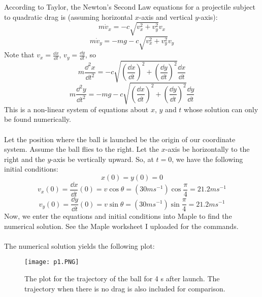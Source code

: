 \documentclass{article}
\begin{document}
\begin{enumerate}
  According to Taylor\cite{Taylor2005}, the Newton's Second Law equations for a projectile subject to quadratic drag is
  (assuming horizontal \(x\)-axis and vertical \(y\)-axis):
  \begin{equation}
     m \dot{v}_x = -c\sqrt{v_{x}^2 +v_y^2} v_x
  \end{equation}
  \begin{equation}
    m\dot{v}_y = -mg - c\sqrt{v_{x}^2 +v_y^2} v_y
  \end{equation}
  Note that \(v_x= \frac{\dd x}{\dd t}\), \(v_y = \frac{\dd y}{\dd t}\), so
  \begin{equation}
     m \frac{\dd^2x}{\dd t^2}  = -c \sqrt{\left(\frac{\dd x}{\dd t}\right)^2 + \left(\frac{\dd y}{\dd t}\right)^2 } \frac{\dd x}{\dd t}
  \end{equation}
  \begin{equation}
    m \frac{\dd^2y}{\dd t^2} = -mg -c \sqrt{\left(\frac{\dd x}{\dd t}\right)^2 + \left(\frac{\dd y}{\dd t}\right)^2 } \frac{\dd y}{\dd t}
  \end{equation}
  This is a non-linear system of equations about \(x\), \(y\) and \(t\) whose solution can only be found numerically.\\
  \\
  Let the position where the ball is launched be the origin of our coordinate system. Assume the ball flies to the right.
  Let the \(x\)-axis be horizontally to the right and the \(y\)-axis be vertically upward. So, at \(t=0\), we have the following
  initial conditions:
  \begin{equation}
    x(0)=y(0)=0
  \end{equation}
  \begin{equation}
    v_x(0) = \frac{\dd x}{\dd t}(0) = v \cos\theta = (30ms^{-1})\cos\frac{\pi}{4} = 21.2 ms^{-1}
  \end{equation}
  \begin{equation}
    v_y(0) = \frac{\dd y}{\dd t}(0)= v \sin\theta = (30ms^{-1})\sin\frac{\pi}{4} = 21.2 ms^{-1}
  \end{equation}
  Now, we enter the equations and initial conditions into Maple to find the numerical solution. See the Maple worksheet I uploaded
  for the commands. \\
  \\
  The numerical solution yields the following plot:
  \begin{figure}[ht]
      \centering
      \texttt{[image: p1.PNG]}
      \caption{The plot for the trajectory of the ball for 4 s after launch. The trajectory when there is no drag is also included for comparison. }

\end{figure}
\end{enumerate}
\end{document}
